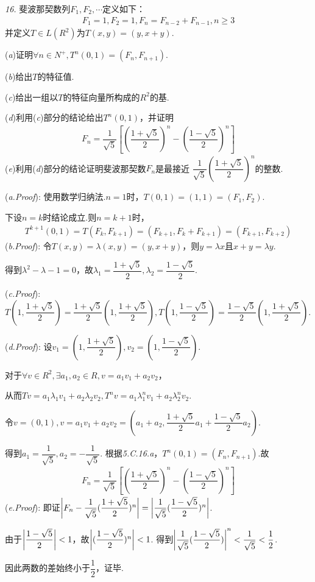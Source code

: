 \newpage

\textit{16.}
{\kaishu 斐波那契数列}\(F_1,F_2,\cdots\)定义如下：
    \begin{align*}
        F_1=1,F_2=1,F_n=F_{n-2}+F_{n-1},n \geq 3
    \end{align*}
并定义\(T \in L(R^2)\)为\(T(x,y)=(y,x+y)\).

(\textit{a})证明\(\forall n \in N^+,T^n(0,1)=(F_n,F_{n+1})\).

(\textit{b})给出\(T\)的特征值.

(\textit{c})给出一组以\(T\)的特征向量所构成的\(R^2\)的基.

(\textit{d})利用(\textit{c})部分的结论给出\(T^n(0,1)\)，并证明
    \begin{align*}
        F_n=\dfrac{1}{\sqrt{5}}[(\dfrac{1+\sqrt{5}}{2})^n-(\dfrac{1-\sqrt{5}}{2})^n]
    \end{align*}
(\textit{e})利用(\textit{d})部分的结论证明{\kaishu 斐波那契数}\(F_n\)是最接近
\(\dfrac{1}{\sqrt{5}}(\dfrac{1+\sqrt{5}}{2})^n\)的整数.

(\textit{a.Proof}):
使用数学归纳法.\(n=1\)时，\(T(0,1)=(1,1)=(F_1,F_2)\).

下设\(n=k\)时结论成立.则\(n=k+1\)时，
    \begin{align*}
        T^{k+1}(0,1)=T(F_k,F_{k+1})=(F_{k+1},F_k+F_{k+1})=(F_{k+1},F_{k+2})
    \end{align*}
(\textit{b.Proof}):
令\(T(x,y)=\lambda(x,y)=(y,x+y)\)，则\(y=\lambda x\)且\(x+y=\lambda y\).

得到\(\lambda^2-\lambda-1=0\)，故\(\lambda_1=\dfrac{1+\sqrt{5}}{2},\lambda_2=\dfrac{1-\sqrt{5}}{2}\).

(\textit{c.Proof}):
$T(1,\dfrac{1+\sqrt{5}}{2})=\dfrac{1+\sqrt{5}}{2}(1,\dfrac{1+\sqrt{5}}{2}),
T(1,\dfrac{1-\sqrt{5}}{2})=\dfrac{1-\sqrt{5}}{2}(1,\dfrac{1+\sqrt{5}}{2})$.

(\textit{d.Proof}):
设\(v_1=(1,\dfrac{1+\sqrt{5}}{2}),v_2=(1,\dfrac{1-\sqrt{5}}{2})\).

对于\(\forall v \in R^2,\exists a_1,a_2 \in R,v=a_1v_1+a_2v_2\)，

从而\(Tv=a_1\lambda_1 v_1+a_2\lambda_2 v_2,T^n v=a_1\lambda_1^n v_1+a_2\lambda_2^n v_2\).

令\(v=(0,1),v=a_1v_1+a_2v_2=(a_1+a_2,\dfrac{1+\sqrt{5}}{2}a_1+\dfrac{1-\sqrt{5}}{2}a_2)\).

得到\(a_1=\dfrac{1}{\sqrt{5}},a_2=-\dfrac{1}{\sqrt{5}}\).
根据\textit{5.C.16.a}，\(T^n(0,1)=(F_n,F_{n+1})\).故
    \begin{align*}
        F_n=\dfrac{1}{\sqrt{5}}[(\dfrac{1+\sqrt{5}}{2})^n-(\dfrac{1-\sqrt{5}}{2})^n]
    \end{align*}
(\textit{e.Proof}):
即证\(\left\lvert F_n-\dfrac{1}{\sqrt{5}}(\dfrac{1+\sqrt{5}}{2})^n \right\rvert=\left\lvert \dfrac{1}{\sqrt{5}}(\dfrac{1-\sqrt{5}}{2})^n \right\rvert\).

由于\(\left\lvert \dfrac{1-\sqrt{5}}{2} \right\rvert<1\)，故\(\left\lvert (\dfrac{1-\sqrt{5}}{2})^n \right\rvert<1\).
得到\(\left\lvert \dfrac{1}{\sqrt{5}}(\dfrac{1-\sqrt{5}}{2}) \right\rvert^n<\dfrac{1}{\sqrt{5}}<\dfrac{1}{2}\).

因此两数的差始终小于\(\dfrac{1}{2}\)，证毕.

